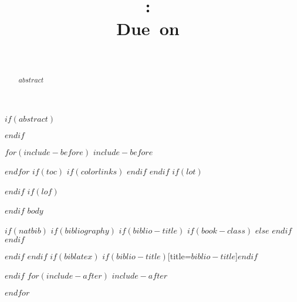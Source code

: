 \documentclass[11pt, letterpaper]{article}
\title{
    \vspace{2in}
    \textmd{\textbf{\hmwkClass:\ \hmwkTitle}}\\
    \normalsize\vspace{0.1in}\small{Due\ on\ \hmwkDueDate}\\
    \vspace{0.1in}\large{\textit{\hmwkClassInstructor\ \hmwkClassTime}} \\
    \vspace{0.1in}\large{\textbf{\hmwkAuthorName}}
    \vspace{3in}
}
\begin{document}
\maketitle
\thispagestyle{empty}
\pagebreak
\thispagestyle{firststyle}
\vskip 13.5pt\relax \normalsize\fontsize{11}{12}
$if(abstract)$
\begin{abstract}
$abstract$
\end{abstract}
$endif$

$for(include-before)$
$include-before$

$endfor$
$if(toc)$
{
$if(colorlinks)$
\hypersetup{linkcolor=$if(toccolor)$$toccolor$$else$black$endif$}
$endif$
\setcounter{tocdepth}{$toc-depth$}
\tableofcontents
}
$endif$
$if(lot)$
\listoftables
$endif$
$if(lof)$
\listoffigures
$endif$
$body$

$if(natbib)$
$if(bibliography)$
$if(biblio-title)$
$if(book-class)$
\renewcommand\bibname{$biblio-title$}
$else$
\renewcommand\refname{$biblio-title$}
$endif$
$endif$


$endif$
$endif$
$if(biblatex)$
\printbibliography$if(biblio-title)$[title=$biblio-title$]$endif$

$endif$
$for(include-after)$
$include-after$

$endfor$
\end{document}

